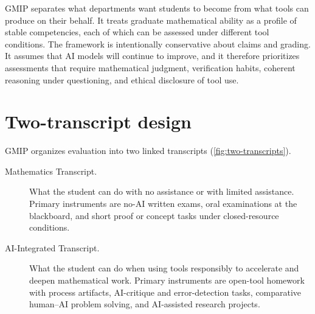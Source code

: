 \documentclass{SIAMbook2023}
\begin{document}
GMIP separates what departments want students to become from what tools can produce on their behalf. It treats graduate mathematical ability as a profile of stable competencies, each of which can be assessed under different tool conditions. The framework is intentionally conservative about claims and grading. It assumes that AI models will continue to improve, and it therefore prioritizes assessments that require mathematical judgment, verification habits, coherent reasoning under questioning, and ethical disclosure of tool use.

\section{Two-transcript design}
\label{app:gmip-transcripts}%

GMIP organizes evaluation into two linked transcripts (\cref{fig:two-transcripts}).

\begin{description}
\item[Mathematics Transcript.] What the student can do with no assistance or with limited assistance. Primary instruments are no-AI written exams, oral examinations at the blackboard, and short proof or concept tasks under closed-resource conditions.

\item[AI-Integrated Transcript.] What the student can do when using tools responsibly to accelerate and deepen mathematical work. Primary instruments are open-tool homework with process artifacts, AI-critique and error-detection tasks, comparative human--AI problem solving, and AI-assisted research projects.
\end{description}
\end{document}
